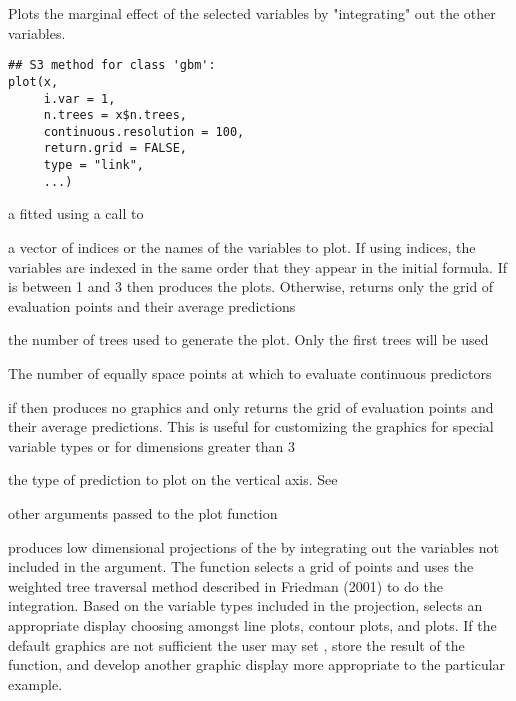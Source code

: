 \documentclass{article}
\begin{document}
\begin{Description}\relax
Plots the marginal effect of the selected variables by "integrating" out the other variables.
\end{Description}
\begin{Usage}
\begin{verbatim}
## S3 method for class 'gbm':
plot(x,
     i.var = 1,
     n.trees = x$n.trees,
     continuous.resolution = 100,
     return.grid = FALSE,
     type = "link",
     ...)
\end{verbatim}
\end{Usage}
\begin{Arguments}
\begin{ldescription}
\item[\code{x}] a  fitted using a call to 
\item[\code{i.var}] a vector of indices or the names of the variables to plot. If
using indices, the variables are indexed in the same order that they appear
in the initial  formula.
If  is between 1 and 3 then  produces the plots. Otherwise,
 returns only the grid of evaluation points and their average predictions
\item[\code{n.trees}] the number of trees used to generate the plot. Only the first
 trees will be used
\item[\code{continuous.resolution}] The number of equally space points at which to
evaluate continuous predictors 
\item[\code{return.grid}] if  then  produces no graphics and only returns
the grid of evaluation points and their average predictions. This is useful for
customizing the graphics for special variable types or for dimensions greater
than 3 
\item[\code{type}] the type of prediction to plot on the vertical axis. See
\item[\code{...}] other arguments passed to the plot function 
\end{ldescription}
\end{Arguments}
\begin{Details}\relax
{} produces low dimensional projections of the
 by integrating out the variables not included in the
 argument. The function selects a grid of points and uses the
weighted tree traversal method described in Friedman (2001) to do the
integration. Based on the variable types included in the projection,
 selects an appropriate display choosing amongst line plots,
contour plots, and  plots. If the default graphics
are not sufficient the user may set , store the result
of the function, and develop another graphic display more appropriate to the
particular example.
\end{Details}
\end{document}
